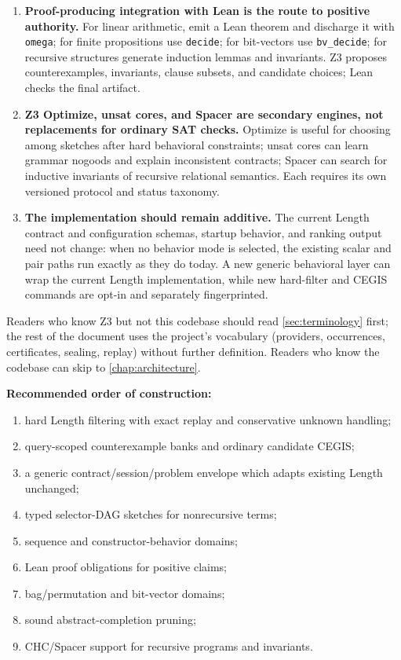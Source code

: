 \documentclass[11pt,oneside]{report}
\newcommand{\code}[1]{\texttt{#1}}
\begin{document}
\begin{enumerate}[leftmargin=2.15em,label=\textbf{\arabic*.}]
\item \textbf{Proof-producing integration with Lean is the route to positive authority.} For linear arithmetic, emit a Lean theorem and discharge it with \code{omega}; for finite propositions use \code{decide}; for bit-vectors use \code{bv\_decide}; for recursive structures generate induction lemmas and invariants. Z3 proposes counterexamples, invariants, clause subsets, and candidate choices; Lean checks the final artifact.

\item \textbf{Z3 Optimize, unsat cores, and Spacer are secondary engines, not replacements for ordinary SAT checks.} Optimize is useful for choosing among sketches after hard behavioral constraints; unsat cores can learn grammar nogoods and explain inconsistent contracts; Spacer can search for inductive invariants of recursive relational semantics. Each requires its own versioned protocol and status taxonomy.

\item \textbf{The implementation should remain additive.} The current Length contract and configuration schemas, startup behavior, and ranking output need not change: when no behavior mode is selected, the existing scalar and pair paths run exactly as they do today. A new generic behavioral layer can wrap the current Length implementation, while new hard-filter and CEGIS commands are opt-in and separately fingerprinted.
\end{enumerate}

Readers who know Z3 but not this codebase should read \cref{sec:terminology} first; the rest of the document uses the project's vocabulary (providers, occurrences, certificates, sealing, replay) without further definition. Readers who know the codebase can skip to \cref{chap:architecture}.

\begin{summarybox}
\textbf{Recommended order of construction:}
\begin{enumerate}[leftmargin=2em]
\item hard Length filtering with exact replay and conservative unknown handling;
\item query-scoped counterexample banks and ordinary candidate CEGIS;
\item a generic contract/session/problem envelope which adapts existing Length unchanged;
\item typed selector-DAG sketches for nonrecursive terms;
\item sequence and constructor-behavior domains;
\item Lean proof obligations for positive claims;
\item bag/permutation and bit-vector domains;
\item sound abstract-completion pruning;
\item CHC/Spacer support for recursive programs and invariants.
\end{enumerate}
\end{summarybox}
\end{document}
